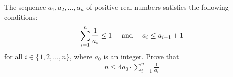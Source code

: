 The sequence $a_1, a_2, \ldots, a_n$ of positive real numbers satisfies the following conditions:
\begin{align*}
\sum_{i=1}^n \frac{1}{a_i} \le 1 \ \ \ \ \hbox{and} \ \ \ \ a_i \le a_{i-1}+1
\end{align*}for all $i\in \lbrace 1, 2, \ldots, n \rbrace$, where $a_0$ is an integer. Prove that
\begin{align*}
n \le 4a_0 \cdot \sum_{i=1}^n \frac{1}{a_i}
\end{align*}